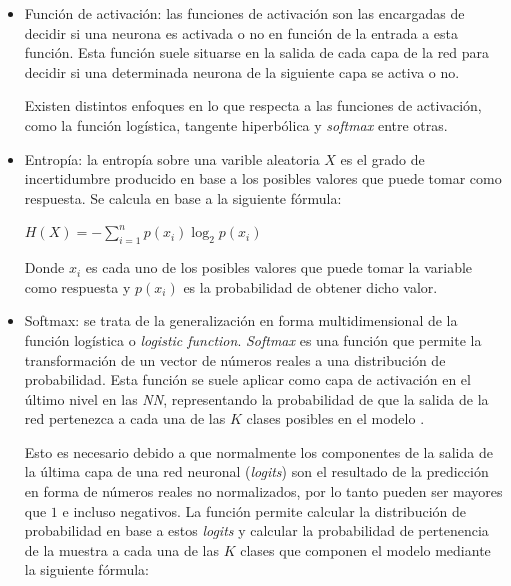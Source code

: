             \begin{itemize}

                \item Función de activación: las funciones de activación son las encargadas de decidir si una neurona es activada o no en función de la entrada a esta función. Esta función suele situarse en la salida de cada capa de la red para decidir si una determinada neurona de la siguiente capa se activa o no.

                    Existen distintos enfoques en lo que respecta a las funciones de activación, como la función logística, tangente hiperbólica y \textit{softmax} entre otras.


                \item Entropía: la entropía sobre una varible aleatoria $X$ es el grado de incertidumbre producido en base a los posibles valores que puede tomar como respuesta. Se calcula en base a la siguiente fórmula:

                    \begin{center}
                        $H(X) = -\sum_{i = 1}^n p(x_i) \log_2 p(x_i)$
                    \end{center}

                    Donde $x_i$ es cada uno de los posibles valores que puede tomar la variable como respuesta y $p(x_i)$ es la probabilidad de obtener dicho valor. 


                \item Softmax: se trata de la generalización en forma multidimensional de la función logística o \textit{logistic function}. \textit{Softmax} es una función que permite la transformación de un vector de números reales a una distribución de probabilidad. Esta función se suele aplicar como capa de activación en el último nivel en las \textit{NN}, representando la probabilidad de que la salida de la red pertenezca a cada una de las $K$ clases posibles en el modelo \cite{Softmax}. 

                    Esto es necesario debido a que normalmente los componentes de la salida de la última capa de una red neuronal (\textit{logits}) son el resultado de la predicción en forma de números reales no normalizados, por lo tanto pueden ser mayores que $1$ e incluso negativos. La función permite calcular la distribución de probabilidad en base a estos \textit{logits} y calcular la probabilidad de pertenencia de la muestra a cada una de las $K$ clases que componen el modelo mediante la siguiente fórmula:



\end{itemize}

